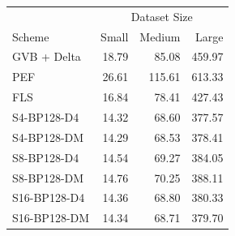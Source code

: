 \begin{tabular}{lrrr}
\toprule
 & \multicolumn{3}{c}{Dataset Size} \\
Scheme & Small & Medium & Large \\
\midrule
GVB + Delta & 18.79 & 85.08 & 459.97 \\
PEF & 26.61 & 115.61 & 613.33 \\
FLS & 16.84 & 78.41 & 427.43 \\
S4-BP128-D4 & 14.32 & 68.60 & 377.57 \\
S4-BP128-DM & 14.29 & 68.53 & 378.41 \\
S8-BP128-D4 & 14.54 & 69.27 & 384.05 \\
S8-BP128-DM & 14.76 & 70.25 & 388.11 \\
S16-BP128-D4 & 14.36 & 68.80 & 380.33 \\
S16-BP128-DM & 14.34 & 68.71 & 379.70 \\
\bottomrule
\end{tabular}
